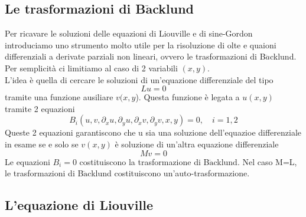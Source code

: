 \documentclass[a4paper,11pt]{report}
\begin{document}
\subsection{Le trasformazioni di B$\ddot{\textbf{a}}$cklund}
Per ricavare le soluzioni delle equazioni di Liouville e di sine-Gordon introduciamo uno strumento molto utile per la risoluzione di olte e quaioni differenziali a derivate parziali non lineari, ovvero le trasformazioni di B$\ddot{a}$cklund.\\
Per semplicità ci limitiamo al caso di 2 variabili $(x,y)$.\\
L'idea è quella di cercare le soluzioni di un'equazione differenziale del tipo
$$
L u=0
$$
tramite una funzione ausiliare $v(x,y$). Questa funzione è legata a $u(x,y)$ tramite 2 equazioni
$$
B_i(u,v,\partial_x u, \partial_y u, \partial_x v, \partial_y v,x,y)=0, \quad i=1,2
$$
Queste 2 equazioni garantiscono che u sia una soluzione dell'equazioe differenziale in esame se e solo se $v(x,y)$ è soluzione di un'altra equazione differenziale
$$
Mv=0
$$
Le equazioni $B_i=0$ costituiscono la trasformazione di B$\ddot{\text{a}}$cklund. Nel caso M=L, le trasformazioni di B$\ddot{\text{a}}$cklund costituiscono un'auto-trasformazione.


\subsection{L'equazione di Liouville}
\end{document}
